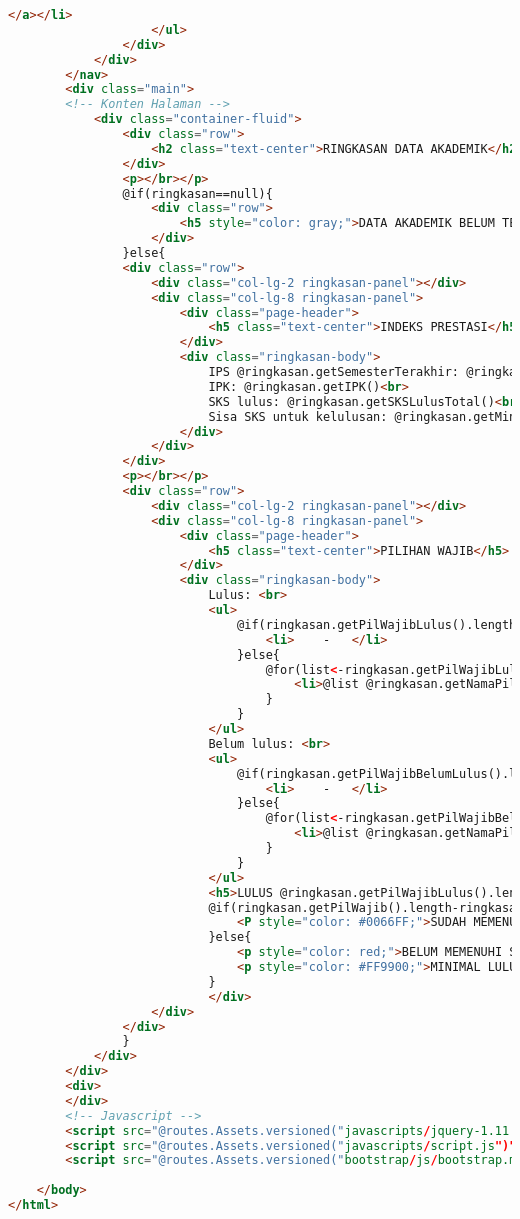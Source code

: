 \begin{lstlisting}[language=html,basicstyle=\tiny,caption=ringkasan.scala.html]
						</a></li>
					</ul>
				</div>
			</div>
		</nav>
		<div class="main">
		<!-- Konten Halaman -->
			<div class="container-fluid">
				<div class="row">
					<h2 class="text-center">RINGKASAN DATA AKADEMIK</h2> 
				</div>
				<p></br></p>
				@if(ringkasan==null){
					<div class="row">
						<h5 style="color: gray;">DATA AKADEMIK BELUM TERSEDIA <span class="glyphicon glyphicon-exclamation-sign"></span></h5>
					</div>	
				}else{
				<div class="row">
					<div class="col-lg-2 ringkasan-panel"></div>
                    <div class="col-lg-8 ringkasan-panel">
						<div class="page-header">
							<h5 class="text-center">INDEKS PRESTASI</h5>
						</div>
						<div class="ringkasan-body">
							IPS @ringkasan.getSemesterTerakhir: @ringkasan.getIPS() dari @ringkasan.getSKSLulusSemTerakhir SKS<br>
							IPK: @ringkasan.getIPK()<br>
							SKS lulus: @ringkasan.getSKSLulusTotal()<br>
							Sisa SKS untuk kelulusan: @ringkasan.getMinSisaSKS()<br>
						</div>
					</div>
                </div>
				<p></br></p>
				<div class="row">
					<div class="col-lg-2 ringkasan-panel"></div>
                    <div class="col-lg-8 ringkasan-panel">
						<div class="page-header">
							<h5 class="text-center">PILIHAN WAJIB</h5>
						</div>
						<div class="ringkasan-body">
							Lulus: <br>
							<ul>
								@if(ringkasan.getPilWajibLulus().length==0){
									<li>	-	</li>
								}else{
									@for(list<-ringkasan.getPilWajibLulus()){
										<li>@list @ringkasan.getNamaPilWajib(list)</li>
									}
								}
							</ul>
							Belum lulus: <br>
							<ul>
								@if(ringkasan.getPilWajibBelumLulus().length==0){
									<li>	-	</li>
								}else{
									@for(list<-ringkasan.getPilWajibBelumLulus()){
										<li>@list @ringkasan.getNamaPilWajib(list)</li>
									}
								}
							</ul>
							<h5>LULUS @ringkasan.getPilWajibLulus().length DARI @ringkasan.getPilWajib().length MATA KULIAH PILIHAN WAJIB</h5>
							@if(ringkasan.getPilWajib().length-ringkasan.getPilWajibBelumLulus().length>=ringkasan.getMinLulusPilWajib()){
								<P style="color: #0066FF;">SUDAH MEMENUHI SYARAT KELULUSAN MATA KULIAH PILIHAN WAJIB <span class="glyphicon glyphicon-flag"></span></P>
							}else{
								<p style="color: red;">BELUM MEMENUHI SYARAT KELULUSAN MATA KULIAH PILIHAN WAJIB <span class="glyphicon glyphicon-remove"></span></p>
								<p style="color: #FF9900;">MINIMAL LULUS @(ringkasan.getMinLulusPilWajib()-ringkasan.getPilWajibLulus().length) MATA KULIAH PILIHAN WAJIB LAGI <span class="glyphicon glyphicon-warning-sign"></span></p>
							}
							</div>
					</div>
                </div>
                }
			</div>
		</div>
		<div>
		</div>
		<!-- Javascript -->
		<script src="@routes.Assets.versioned("javascripts/jquery-1.11.3.min.js")"></script>
		<script src="@routes.Assets.versioned("javascripts/script.js")"></script>
		<script src="@routes.Assets.versioned("bootstrap/js/bootstrap.min.js")"></script>
		
    </body>
</html>
\end{lstlisting}
